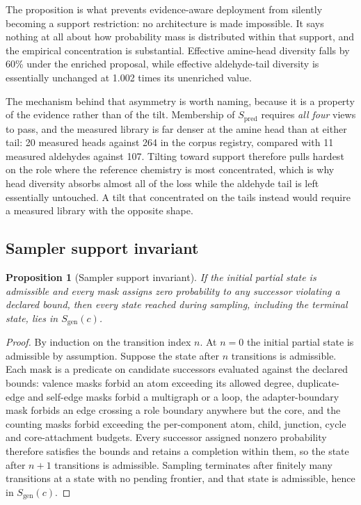 \documentclass{article}
\newtheorem{proposition}{Proposition}
\newcommand{\AldehydeReg}{107}
\newcommand{\AmineReg}{264}
\newcommand{\AmineDiversityDrop}{60\%}        %
\newcommand{\AldehydeDiversityRatio}{1.002}   %
\newcommand{\Sgen}{\ensuremath{S_{\mathrm{gen}}}}
\newcommand{\Spred}{\ensuremath{S_{\mathrm{pred}}}}
\begin{document}
The proposition is what prevents evidence-aware deployment from silently becoming a support
restriction: no architecture is made impossible. It says nothing at all about how probability mass
is distributed within that support, and the empirical concentration is substantial. Effective
amine-head diversity falls by \AmineDiversityDrop{} under the enriched proposal, while effective
aldehyde-tail diversity is essentially unchanged at \AldehydeDiversityRatio{} times its unenriched
value.

The mechanism behind that asymmetry is worth naming, because it is a property of the evidence
rather than of the tilt. Membership of \Spred{} requires \emph{all four} views to pass, and the
measured library is far denser at the amine head than at either tail: 20 measured heads against
\AmineReg{} in the corpus registry, compared with 11 measured aldehydes against \AldehydeReg{}.
Tilting toward support therefore pulls hardest on the role where the reference chemistry is most
concentrated, which is why head diversity absorbs almost all of the loss while the aldehyde tail is
left essentially untouched. A tilt that concentrated on the tails instead would require a measured
library with the opposite shape.

\subsection{Sampler support invariant}
\label{app:sampler-invariant}

\begin{proposition}[Sampler support invariant]
\label{prop:sampler}
If the initial partial state is admissible and every mask assigns zero probability to any successor
violating a declared bound, then every state reached during sampling, including the terminal state,
lies in $\Sgen(c)$.
\end{proposition}

\begin{proof}
By induction on the transition index $n$. At $n = 0$ the initial partial state is admissible by
assumption. Suppose the state after $n$ transitions is admissible. Each mask is a predicate on
candidate successors evaluated against the declared bounds: valence masks forbid an atom exceeding
its allowed degree, duplicate-edge and self-edge masks forbid a multigraph or a loop, the
adapter-boundary mask forbids an edge crossing a role boundary anywhere but the core, and the
counting masks forbid exceeding the per-component atom, child, junction, cycle and core-attachment
budgets. Every successor assigned nonzero probability therefore satisfies the bounds and retains a
completion within them, so the state after $n+1$ transitions is admissible. Sampling terminates
after finitely many transitions at a state with no pending frontier, and that state is admissible,
hence in $\Sgen(c)$.
\end{proof}
\end{document}
